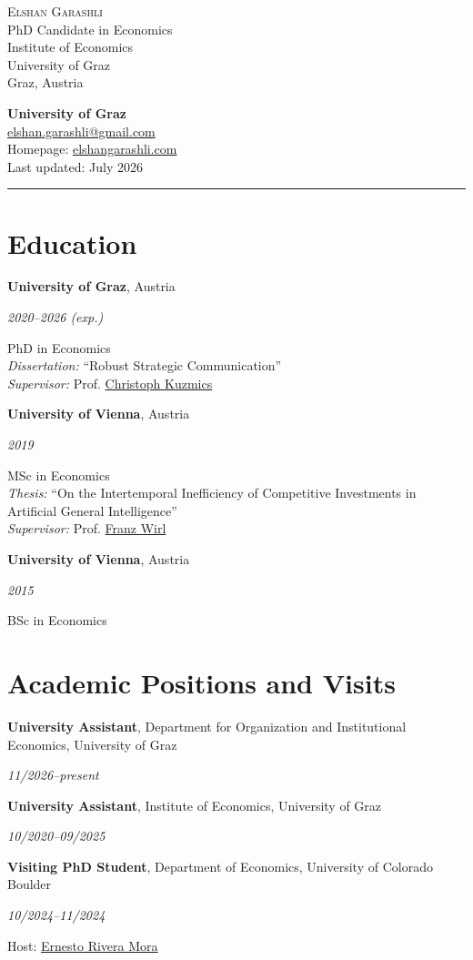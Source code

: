\documentclass[11pt,letterpaper]{article}
\newcommand{\unigrazmark}{%
  {\normalsize\bfseries University of Graz}%
}
\newcommand{\entry}[2]{%
  \par\noindent
  \begin{minipage}[t]{0.73\textwidth}
    \raggedright #1
  \end{minipage}%
  \hfill
  \begin{minipage}[t]{0.24\textwidth}
    \raggedleft\itshape #2
  \end{minipage}%
  \par
}
\newcommand{\cvsection}[1]{%
  \Needspace{6\baselineskip}%
  \section*{#1}%
}
\begin{document}
\begin{minipage}[t]{0.56\textwidth}
  \raggedright
  {\huge\scshape Elshan Garashli}\\[0.2em]
  {\large PhD Candidate in Economics}\\[0.45em]
  Institute of Economics\\
  University of Graz\\
  Graz, Austria
\end{minipage}%
\hfill
\begin{minipage}[t]{0.38\textwidth}
  \raggedleft
  \unigrazmark\\[0.7em]
  \href{mailto:elshan.garashli@gmail.com}{elshan.garashli@gmail.com}\\
  Homepage: \href{https://elshangarashli.com}{elshangarashli.com}\\
  Last updated: July 2026
\end{minipage}

\vspace{0.6em}
{\color{unigrazgray}\rule{\textwidth}{0.5pt}}

\cvsection{Education}
\entry{\textbf{University of Graz}, Austria}{2020--2026 (exp.)}
PhD in Economics\\
\textit{Dissertation:} ``Robust Strategic Communication''\\
\textit{Supervisor:} Prof. \href{https://sites.google.com/view/christoph-kuzmics}{Christoph Kuzmics}

\medskip
\entry{\textbf{University of Vienna}, Austria}{2019}
MSc in Economics\\
\textit{Thesis:} ``On the Intertemporal Inefficiency of Competitive Investments in Artificial General Intelligence''\\
\textit{Supervisor:} Prof. \href{https://scholar.google.com/citations?user=S-NOuSEAAAAJ&hl=en}{Franz Wirl}

\medskip
\entry{\textbf{University of Vienna}, Austria}{2015}
BSc in Economics

\cvsection{Academic Positions and Visits}
\entry{\textbf{University Assistant}, Department for Organization and Institutional Economics, University of Graz}{11/2026--present}

\medskip
\entry{\textbf{University Assistant}, Institute of Economics, University of Graz}{10/2020--09/2025}

\medskip
\entry{\textbf{Visiting PhD Student}, Department of Economics, University of Colorado Boulder}{10/2024--11/2024}
Host: \href{https://www.ernestoriveramora.com/}{Ernesto Rivera Mora}
\end{document}
